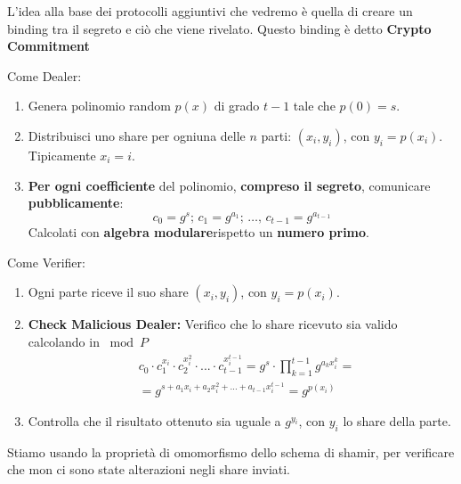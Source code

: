 L'idea alla base dei protocolli aggiuntivi che vedremo è quella di creare un binding tra il segreto e ciò che viene rivelato. Questo binding è detto \textbf{Crypto Commitment}
\begin{theorem}\label{thm:feldvss}
Come Dealer:
\begin{enumerate}
    \item Genera polinomio random $p(x)$ di grado $t-1$ tale che $p(0)=s$.
    \item Distribuisci uno share per ogniuna delle $n$ parti: $(x_i, y_i)$, con $y_i=p(x_i)$. Tipicamente $x_i=i$.
    \item \textbf{Per ogni coefficiente} del polinomio, \textbf{compreso il segreto}, comunicare \textbf{pubblicamente}:
    \[c_0=g^s;\,c_1=g^{a_1};\,\dots,\,c_{t-1}=g^{a_{t-1}}\]
    Calcolati con \textbf{algebra modulare}\footnotemark rispetto un \textbf{numero primo}.
\end{enumerate}
Come Verifier:
\begin{enumerate}
    \item Ogni parte riceve il suo share $(x_i, y_i)$, con $y_i=p(x_i)$.
    \item \textbf{Check Malicious Dealer:} Verifico che lo share ricevuto sia valido calcolando in $\bmod{P}$
    \begin{equation*}
        \begin{aligned}
            &c_0\cdot c_1^{x_i}\cdot c_2^{x_i^2}\cdot ...\cdot c_{t-1}^{x_i^{t-1}}=
            g^s\cdot\prod_ {k=1}^{t-1}g^{a_k x_i^k}=\\
            &=g^{s+a_1x_i+a_2x_i^2+\dots+a_{t-1}x_i^{t-1}}=g^{p(x_i)}
        \end{aligned}
    \end{equation*}
    \item Controlla che il risultato ottenuto sia uguale a $g^{y_i}$, con $y_i$ lo share della parte.
\end{enumerate}
\end{theorem}
\begin{remark}
Stiamo usando la proprietà di omomorfismo dello schema di shamir, per verificare che mon ci sono state alterazioni negli share inviati.
\end{remark}
